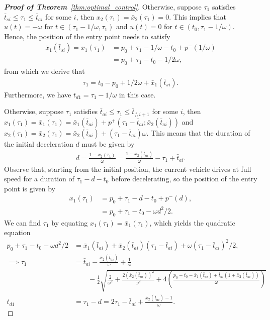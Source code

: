 \documentclass[a4paper]{article}
\theoremstyle{definition}
\theoremstyle{plain}
\begin{document}
\begin{proof}[\normalfont\textbf{Proof of Theorem}~\ref{thm:optimal_control}]
Otherwise, suppose $\tau_{1}$ satisfies $\bar{t}_{si} \leq \tau_{1} \leq \bar{t}_{ai}$ for
some $i$, then $x_{2}(\tau_{1}) = \bar{x}_{2}(\tau_{1}) = 0$. This implies that
$u(t) = -\omega$ for $t \in (\tau_{1} - 1/\omega, \tau_{1})$ and $u(t) = 0$ for
$t \in (t_{0}, \tau_{1} - 1/\omega)$. Hence, the position of the entry point
needs to satisfy
\begin{align*}
  \bar{x}_{1}(\bar{t}_{si}) = x_{1}(\tau_{1}) &= p_{0} + \tau_{1} - 1/\omega - t_{0} + p^{-}(1/\omega) \\
                       &= p_{0} + \tau_{1}- t_{0} -1/2\omega ,
\end{align*}
from which we derive that
\begin{align*}
  \tau_{1} = t_{0} - p_{0} + 1/2\omega + \bar{x}_{1}(\bar{t}_{si}) .
\end{align*}
Furthermore, we have $t_{d1} = \tau_{1} - 1/\omega$ in this case.

Otherwise, suppose $\tau_{1}$ satisfies
$\bar{t}_{ai} \leq \tau_{1} \leq \bar{t}_{f,i+1}$ for some $i$, then
$x_{1}(\tau_{1}) = \bar{x}_{1}(\tau_{1}) = \bar{x}_{1}(\bar{t}_{ai}) + p^{+}(\tau_{1} - \bar{t}_{ai}; \bar{x}_{2}(\bar{t}_{ai})) $
and
$x_{2}(\tau_{1}) = \bar{x}_{2}(\tau_{1}) = \bar{x}_{2}(\bar{t}_{ai}) +  (\tau_{1} - \bar{t}_{ai}) \omega$.
This means that the duration of the initial deceleration $d$ must be given by
\begin{align*}
  d = \frac{1 - x_{2}(\tau_{1})}{\omega} = \frac{1 - \bar{x}_{2}(\bar{t}_{ai})}{\omega} - \tau_{1} + \bar{t}_{ai} .
\end{align*}
Observe that, starting from the initial position, the current vehicle drives at full speed for
a duration of $\tau_{1} - d - t_{0}$ before decelerating, so the position of the
entry point is given by
\begin{align*}
   x_{1}(\tau_{1}) &= p_{0} + \tau_{1} - d - t_{0} + p^{-}(d) , \\
          &= p_{0} + \tau_{1} - t_{0} - \omega d^{2} / 2 .
\end{align*}
%
We can find $\tau_{1}$ by equating $x_{1}(\tau_{1}) = \bar{x}_{1}(\tau_{1})$,
which yields the quadratic equation
\begin{align*}
  p_{0} + \tau_{1} - t_{0} - \omega d^{2} / 2 &= \bar{x}_{1}(\bar{t}_{ai}) + \bar{x}_{2}(\bar{t}_{ai})(\tau_{1} - \bar{t}_{ai}) + \omega (\tau_{1} - \bar{t}_{ai})^{2} / 2 , \\
  \implies \tau_{1} &= \bar{t}_{ai} -\frac{\bar{x}_{2}(\bar{t}_{ai})}{\omega} + \frac{1}{\omega} \\
  &\quad\quad - \frac{1}{2}\sqrt{\frac{2}{\omega^{2}} + \frac{2(\bar{x}_{2}(\bar{t}_{ai}))^{2}}{\omega^{2}} + 4\left( \frac{p_{0} - t_{0} - \bar{x}_{1}(\bar{t}_{ai}) + \bar{t}_{ai}(1 + \bar{x}_{2}(\bar{t}_{ai}))}{\omega} \right)} \\
  t_{d1} &= \tau_{1} - d = 2 \tau_{1} - \bar{t}_{ai} + \frac{\bar{x}_{2}(\bar{t}_{ai}) - 1}{\omega} .
\end{align*}


\end{proof}
\end{document}

